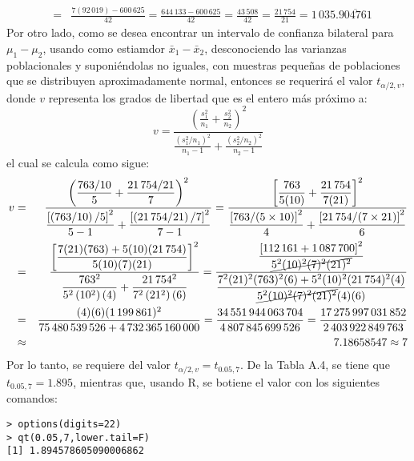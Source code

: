 \begin{solucion}
\begin{eqnarray*}
  & = & \frac{7(92\,019) - 600\,625}{42} = \frac{644\,133 - 600\,625}{42} = \frac{43\,508}{42} = \frac{21\,754}{21} = 1\,035.\overline{904761}
 \end{eqnarray*}
 Por otro lado, como se desea encontrar un intervalo de confianza bilateral para $\mu_1 - \mu_2$, usando como estiamdor $\bar{x}_1 - \bar{x}_2$, desconociendo las varianzas poblacionales y suponi\'endolas no iguales, con muestras peque\~nas de poblaciones que se distribuyen aproximadamente normal, entonces se requerir\'a el valor $t_{\alpha/2,v}$, donde $v$ representa los grados de libertad que es el entero m\'as pr\'oximo a:
 \begin{equation*}
  v = \frac{\displaystyle{ \left( \frac{s_1^2}{n_1} + \frac{s_2^2}{n_2} \right)^2 }}{\displaystyle{ \frac{\left( s_1^2/n_1 \right)^2}{n_1 - 1} + \frac{\left( s_2^2/n_2 \right)^2}{n_2 - 1} }}
 \end{equation*}
 el cual se calcula como sigue:
 \begin{eqnarray*}
  v & = & \frac{\displaystyle{ \left( \frac{763/10}{5} + \frac{21\,754/21}{7} \right)^2 }}{\displaystyle{ \frac{\left[ \left( 763/10 \right)/5 \right]^2}{5-1} + \frac{\left[ \left( 21\,754/21 \right)/ 7 \right]^2}{7 - 1} }} = \frac{\displaystyle{ \left[ \frac{763}{5(10)} + \frac{21\,754}{7(21)}  \right]^2 }}{\displaystyle{ \frac{\left[ 763/(5\times 10)  \right]^2}{4} + \frac{\left[ 21\,754/(7\times 21) \right]^2}{6} }} \\
  & = & \frac{\displaystyle{ \left[ \frac{7(21)(763) + 5(10)(21\,754)}{5(10)(7)(21)} \right]^2 } }{ \displaystyle{ \frac{763^2}{5^2\left( 10^2 \right)(4)  } + \frac{21\,754^2}{7^2\left( 21^2 \right)(6) } } } = \frac{\displaystyle{ \frac{\left[ 112\,161 + 1\,087\,700 \right]^2}{\cancel{5^2(10)^2(7)^2(21)^2}} } }{\displaystyle{ \frac{ 7^2(21)^2(763)^2(6) + 5^2(10)^2(21\,754)^2(4) }{\cancel{5^2(10)^2(7)^2(21)^2}(4)(6)} } } \\
  & = & \frac{(4)(6)(1\,199\,861)^2}{75\,480\,539\,526 + 4\,732\,365\,160\,000} = \frac{34\,551\,944\,063\,704}{4\,807\,845\,699\,526} = \frac{17\,275\,997\,031\,852}{2\,403\,922\,849\,763} \\
  & \approx & 7.18658547 \approx 7
 \end{eqnarray*}
 Por lo tanto, se requiere del valor $t_{\alpha/2,v} = t_{0.05,7}$. De la Tabla A.4, se tiene que $t_{0.05,7} = 1.895$, mientras que, usando R, se botiene el valor con los siguientes comandos:
 \begin{verbatim}
> options(digits=22)
> qt(0.05,7,lower.tail=F)
[1] 1.894578605090006862

\end{verbatim}
\end{solucion}
